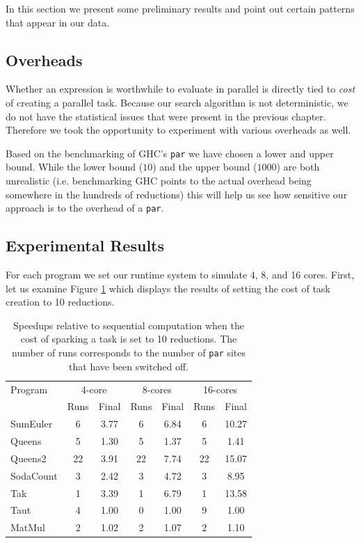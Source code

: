 In this section we present some preliminary results and point out certain patterns
that appear in our data. 

\subsection*{Overheads} Whether an expression is worthwhile to evaluate in
parallel is directly tied to \emph{cost} of creating a parallel task. Because
our search algorithm is not deterministic, we do not have the statistical
issues that were present in the previous chapter. Therefore we took the
opportunity to experiment with various overheads as well.

Based on the benchmarking of GHC's \verb|par| we have chosen a lower and upper
bound.  While the lower bound ($10$) and the upper bound ($1000$) are both
unrealistic (i.e. benchmarking GHC points to the actual overhead being
somewhere in the hundreds of reductions) this will help us see how sensitive
our approach is to the overhead of a \verb|par|.


\subsection*{Experimental Results}

For each program we set our runtime system to simulate 4, 8, and 16 cores.
First, let us examine Figure \ref{table10} which displays the results of setting
the cost of task creation to 10 reductions.

\begin{table}[ht]
\caption[Profile-Directed Search with an overhead of $10$ reductions]{Speedups relative to sequential computation when the cost of sparking
        a task is set to 10 reductions. The number of runs corresponds to the
        number of \texttt{par} sites that have been switched off.}
\centering
\smallskip
  \begin{tabular}{ l||c c c c c c  }
    Program & \multicolumn{2}{c}{4-core} & \multicolumn{2}{c}{8-cores} & \multicolumn{2}{c}{16-cores} \\
            & Runs & Final     & Runs & Final      & Runs & Final \\
    \hline
    SumEuler  & 6    & 3.77      & 6    & 6.84       & 6    & 10.27     \\
    Queens    & 5    & 1.30      & 5    & 1.37       & 5    & 1.41  \\
    Queens2   & 22   & 3.91      & 22   & 7.74       & 22   & 15.07   \\
    SodaCount & 3    & 2.42      & 3    & 4.72       & 3    & 8.95    \\
    Tak       & 1    & 3.39      & 1    & 6.79       & 1    & 13.58   \\
    Taut      & 4    & 1.00      & 0    & 1.00       & 9    & 1.00  \\
    MatMul    & 2    & 1.02      & 2    & 1.07       & 2    & 1.10   \\
  \end{tabular}
\label{table10}
\end{table}

